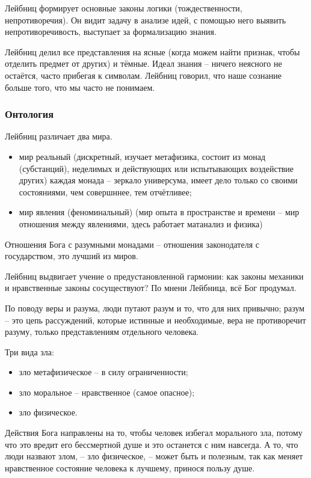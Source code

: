 \documentclass[a4paper, 12pt]{book} %
\begin{document}
Лейбниц формирует основные законы логики (тождественности, непротиворечия). Он видит задачу в анализе идей, с помощью него выявить непротиворечивость, выступает за формализацию знания.

Лейбниц делил все представления на ясные (когда можем найти признак, чтобы отделить предмет от других) и тёмные. Идеал знания -- ничего неясного не остаётся, часто прибегая к символам. Лейбниц говорил, что наше сознание больше того, что мы часто не понимаем.

\subsubsection{Онтология}
Лейбниц различает два мира.
\begin{itemize}
\item мир реальный (дискретный, изучает метафизика, состоит из монад (субстанций), неделимых и действующих или испытывающих воздействие других) каждая монада -- зеркало универсума, имеет дело только со своими состояниями, чем совершннее, тем отчётливее; 
\item мир явления (феноминальный) (мир опыта в пространстве и времени -- мир отношения между явлениями, здесь работает матанализ и физика)
\end{itemize}	

Отношения Бога с разумными монадами -- отношения законодателя с государством, это лучший из миров.

Лейбниц выдвигает учение о предустановленной гармонии: как законы механики и нравственные законы сосуществуют? По мнени Лейбница, всё Бог продумал.

По поводу веры и разума, люди путают разум и то, что для них привычно; разум -- это цепь рассуждений, которые истинные и необходимые, вера не противоречит разуму, только представлениям отдельного человека.

Три вида зла:
\begin{itemize}
\item зло метафизическое -- в силу ограниченности;
\item зло моральное -- нравственное (самое опасное);
\item зло физическое.
\end{itemize}
Действия Бога направлены на то, чтобы человек избегал морального зла, потому что это вредит его бессмертной душе и это останется с ним навсегда. А то, что люди назвают злом, -- зло физическое, -- может быть и полезным, так как меняет нравственное состояние человека к лучшему, принося пользу душе.
\end{document}
